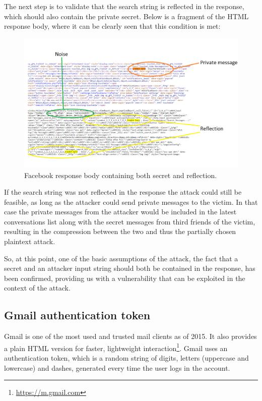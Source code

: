 The next step is to validate that the search string is reflected in the
response, which should also contain the private secret. Below is a fragment of
the HTML response body, where it can be clearly seen that this condition is met:

\begin{figure}[h] \caption{Facebook response body containing both secret and
reflection.} \centering
\includegraphics[width=1.1\textwidth]{diagrams/fb_response.png}\end{figure}

If the search string was not reflected in the response the attack could still
be feasible, as long as the attacker could send private messages to the victim.
In that case the private messages from the attacker would be included in the
latest conversations list along with the secret messages from third friends of
the victim, resulting in the compression between the two and thus the partially
chosen plaintext attack.

So, at this point, one of the basic assumptions of the attack, the fact that a
secret and an attacker input string should both be contained in the response,
has been confirmed, providing us with a vulnerability that can be exploited in
the context of the attack.

\subsection{Gmail authentication token}\label{subsec:gmail_token}

Gmail is one of the most used and trusted mail clients as of 2015. It also
provides a plain HTML version for faster, lightweight
interaction\footnote{\url{https://m.gmail.com}}. Gmail uses an authentication
token, which is a random string of digits, letters (uppercase and lowercase) and
dashes, generated every time the user logs in the account.

